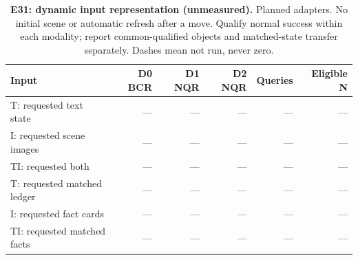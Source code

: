 \begin{table}[!ht]
\centering\small
\caption{\textbf{E31: dynamic input representation (unmeasured).} Planned adapters. No initial scene or automatic refresh after a move. Qualify normal success within each modality; report common-qualified objects and matched-state transfer separately. Dashes mean not run, never zero.}
\begin{tabularx}{\textwidth}{@{}Xrrrrr@{}}\toprule
Input & D0 BCR & D1 NQR & D2 NQR & Queries & Eligible N\\\midrule
T: requested text state & --- & --- & --- & --- & ---\\
I: requested scene images & --- & --- & --- & --- & ---\\
TI: requested both & --- & --- & --- & --- & ---\\
T: requested matched ledger & --- & --- & --- & --- & ---\\
I: requested fact cards & --- & --- & --- & --- & ---\\
TI: requested matched facts & --- & --- & --- & --- & ---\\
\bottomrule
\end{tabularx}
\end{table}
